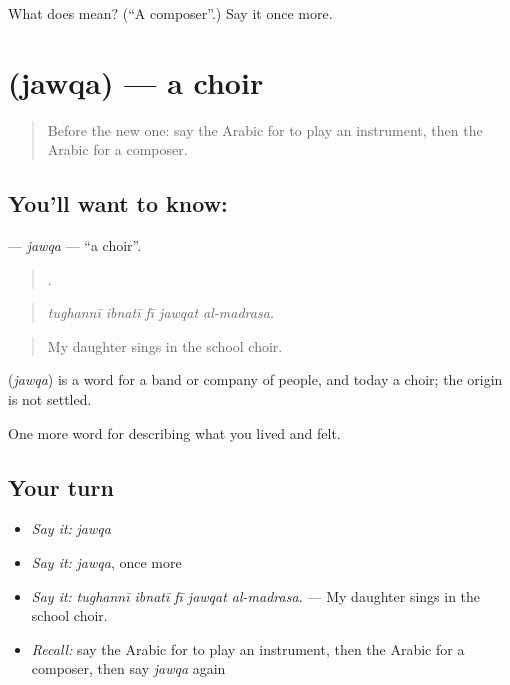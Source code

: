 \begin{tcolorbox}[breakable,colback=teal!4,colframe=teal!35!black,title={Before you move on}]
What does  mean? (\textquotedblleft{}A composer\textquotedblright{}.) Say it once more.
\end{tcolorbox}
\section[\texorpdfstring{\ar{جوقة} (jawqa)}{جوقة (jawqa)}]{ (jawqa) — a choir}

\label{lesson:AR-C543-jawqa}



\begin{quote}
Before the new one: say the Arabic for to play an instrument, then the Arabic for a composer.
\end{quote}

\subsection*{You'll want to know: }
\textbf{} — \emph{jawqa} — \textquotedblleft{}a choir\textquotedblright{}.

\begin{quote}
    .
\end{quote}

\begin{quote}
\emph{tughannī ibnatī fī jawqat al-madrasa.}
\end{quote}

\begin{quote}
My daughter sings in the school choir.
\end{quote}

\begin{cousinweb}
\textbf{} (\emph{jawqa}) is a word for a band or company of people, and today a choir; the origin is not settled.
\end{cousinweb}

\begin{grammarlens}[title={What you've built}]
One more word for describing what you lived and felt.
\end{grammarlens}

\subsection*{Your turn}
\begin{itemize}
\raggedright
  \item \emph{Say it:} \emph{jawqa}
  \item \emph{Say it:} \emph{jawqa}, once more
  \item \emph{Say it:} \emph{tughannī ibnatī fī jawqat al-madrasa.} — My daughter sings in the school choir.
  \item \emph{Recall:} say the Arabic for to play an instrument, then the Arabic for a composer, then say \emph{jawqa} again
\end{itemize}

